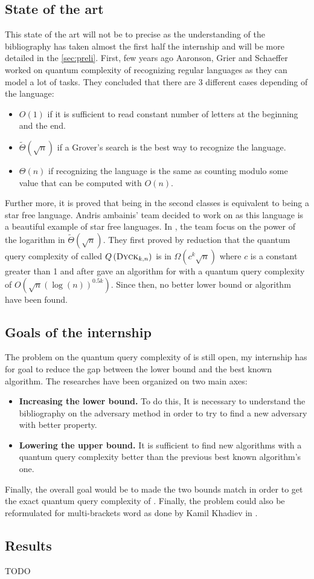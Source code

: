 \subsection{State of the art}
This state of the art will not be to precise as the understanding of the
bibliography has taken almost the first half the internship and will be
more detailed in the \autoref{sec:preli}. First, few years ago Aaronson,
Grier and Schaeffer \cite[2019]{trichotomy_not_andris} worked on quantum complexity
of recognizing regular languages as they can model a lot of tasks. They
concluded that there are 3 different cases depending of the language:
\begin{itemize}
    \item $O(1)$ if it is sufficient to read constant number of letters at the beginning and the end.
    \item $\tilde{\Theta}(\sqrt{n})$ if a Grover's search is the best way to recognize the language.
    \item $\Theta(n)$ if recognizing the language is the same as counting modulo some value that can
          be computed with $O(n)$.
\end{itemize}
Further more, it is proved that being in the second classes is equivalent to
being a star free language. Andris ambainis' team decided to work on  as this
language is a beautiful example of star free languages. In \cite[2020]{art:2DGrid},
the team focus on the power of the logarithm in $\tilde{\Theta}\left(\sqrt{n}\right)$.
They first proved by reduction that the quantum query complexity of 
called $Q\left(\textsc{Dyck$_{k, n}$}\right)$ is in $\Omega\left(c^k\sqrt{n}\right)$ where $c$ is
a constant greater than 1 and after gave an algorithm for  with a quantum
query complexity of $O\left(\sqrt{n}(\log(n))^{0.5k}\right)$. Since then, no better
lower bound or algorithm have been found.

\subsection{Goals of the internship}
The problem on the quantum query complexity of  is still open, my internship
has for goal to reduce the gap between the lower bound and the best known algorithm.
The researches have been organized on two main axes:
\begin{itemize}
    \item \textbf{Increasing the lower bound.} To do this, It is necessary to understand the bibliography
          on the adversary method in order to try to find a new adversary with better property.
    \item \textbf{Lowering the upper bound.} It is sufficient to find new algorithms
          with a quantum query complexity better than  the previous best known algorithm's one.
\end{itemize}
Finally, the overall goal would be to made the two bounds match in order to get the exact quantum
query complexity of . Finally, the problem could also be reformulated for multi-brackets word
as done by Kamil Khadiev in \cite{DBLP:conf/uc/KhadievK21}.

\subsection{Results}

{\color{red} \Huge TODO}